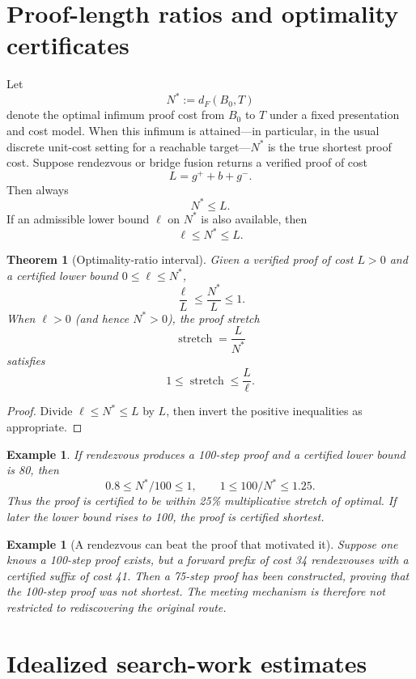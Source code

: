 \documentclass[11pt]{article}
\newtheorem{theorem}[definition]{Theorem}
\newtheorem{example}[definition]{Example}
\begin{document}
\section{Proof-length ratios and optimality certificates}

Let
\[
N^*:=d_F(B_0,T)
\]
denote the optimal infimum proof cost from $B_0$ to $T$ under a fixed presentation and cost model. When this infimum is attained---in particular, in the usual discrete unit-cost setting for a reachable target---$N^*$ is the true shortest proof cost. Suppose rendezvous or bridge fusion returns a verified proof of cost
\[
L=g^++b+g^-.
\]
Then always
\[
N^*\le L.
\]
If an admissible lower bound $\ell$ on $N^*$ is also available, then
\[
\ell\le N^*\le L.
\]

\begin{theorem}[Optimality-ratio interval]
Given a verified proof of cost $L>0$ and a certified lower bound $0\le\ell\le N^*$,
\[
\boxed{\frac{\ell}{L}\le \frac{N^*}{L}\le1.}
\]
When $\ell>0$ (and hence $N^*>0$), the proof stretch
\[
\operatorname{stretch}=\frac{L}{N^*}
\]
satisfies
\[
\boxed{1\le\operatorname{stretch}\le\frac{L}{\ell}}.
\]
\end{theorem}

\begin{proof}
Divide $\ell\le N^*\le L$ by $L$, then invert the positive inequalities as appropriate.
\end{proof}

\begin{example}
If rendezvous produces a 100-step proof and a certified lower bound is 80, then
\[
0.8\le N^*/100\le1,
\qquad
1\le 100/N^*\le1.25.
\]
Thus the proof is certified to be within 25\% multiplicative stretch of optimal. If later the lower bound rises to 100, the proof is certified shortest.
\end{example}

\begin{example}[A rendezvous can beat the proof that motivated it]
Suppose one knows a 100-step proof exists, but a forward prefix of cost 34 rendezvouses with a certified suffix of cost 41. Then a 75-step proof has been constructed, proving that the 100-step proof was not shortest. The meeting mechanism is therefore not restricted to rediscovering the original route.
\end{example}

\section{Idealized search-work estimates}
\end{document}
